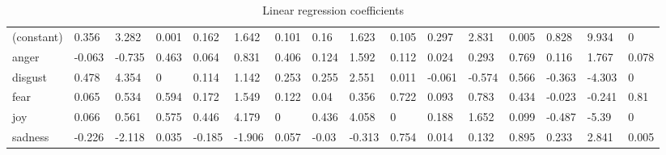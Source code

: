 \documentclass[graybox]{svmult}
\begin{document}
{\begin{table}[!ht]
{\begin{tabular}{@{}llll|lll|lll|lll|lll@{}}
(constant) & 0.356                 & 3.282                 & 0.001                   & 0.162                 & 1.642                 & 0.101                   & 0.16                  & 1.623                 & 0.105                   & 0.297      & 2.831     & 0.005    & 0.828          & 9.934   & 0      \\
anger      & -0.063                & -0.735                & 0.463                   & 0.064                 & 0.831                 & 0.406                   & 0.124                 & 1.592                 & 0.112                   & 0.024      & 0.293     & 0.769    & 0.116          & 1.767    & 0.078     \\
disgust    & 0.478                 & 4.354                 & 0                       & 0.114                 & 1.142                 & 0.253                   & 0.255                 & 2.551                 & 0.011                   & -0.061     & -0.574    & 0.566    & -0.363         & -4.303    & 0    \\
fear       & 0.065                 & 0.534                 & 0.594                   & 0.172                 & 1.549                 & 0.122                   & 0.04                  & 0.356                 & 0.722                   & 0.093      & 0.783     & 0.434    & -0.023         & -0.241    & 0.81    \\
joy        & 0.066                 & 0.561                 & 0.575                   & 0.446                 & 4.179                 & 0                       & 0.436                 & 4.058                 & 0                       & 0.188      & 1.652     & 0.099    & -0.487         & -5.39   & 0      \\
sadness    & -0.226                & -2.118                & 0.035                   & -0.185                & -1.906                & 0.057                   & -0.03                 & -0.313                & 0.754                   & 0.014      & 0.132     & 0.895    & 0.233          & 2.841     & 0.005    \\

\bottomrule

\end{tabular}%
}
\caption{Linear regression coefficients}
\label{tbl:linreg}
\end{table}

}
\end{document}
